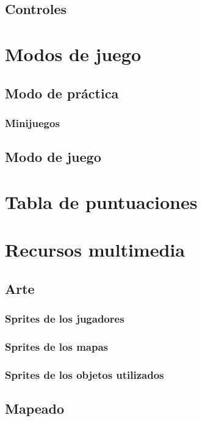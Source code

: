 \documentclass[12pt, spanish]{article}
\begin{document}
\subsection{Controles}


\section{Modos de juego}

\subsection{Modo de práctica}

\subsubsection{Minijuegos}

\subsection{Modo de juego}

\section{Tabla de puntuaciones}



\section{Recursos multimedia}

\subsection{Arte}

\subsubsection{Sprites de los jugadores}

\subsubsection{Sprites de los mapas}

\subsubsection{Sprites de los objetos utilizados}


\subsection{Mapeado}
\end{document}
